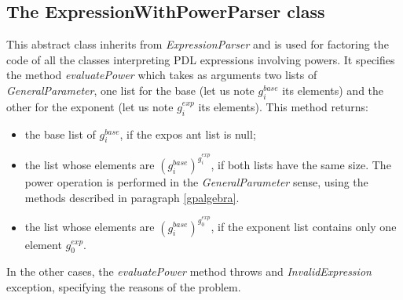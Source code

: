 \documentclass[a4paper,11pt] {ivoa}
\begin{document}
\subsection{The ExpressionWithPowerParser class}
This abstract class inherits from {\it ExpressionParser} and is used for factoring the code of all the classes interpreting PDL expressions involving powers. 
It specifies the method {\it evaluatePower} which takes as arguments two lists of {\it GeneralParameter}, one list for the base (let us note $g_i^{base}$ its elements) 
and the other for the exponent (let us note $g_i^{exp}$ its elements). This method returns:
\begin{itemize}
\item the base list of $g_i^{base}$, if the expos ant list is null;\\
\item the list whose elements are $\displaystyle \left(g_i^{base}\right)^{g_i^{exp}}$, if both lists have the same size. The power operation is performed in the {\it GeneralParameter} sense, using the methods described in paragraph \ref{gpalgebra}.
\item the list whose elements are  $\displaystyle \left(g_i^{base}\right)^{g_0^{exp}}$, if the exponent list contains only one element $g_0^{exp}$.
\end{itemize}
In the other cases, the  {\it evaluatePower} method throws and {\it InvalidExpression} exception, specifying the reasons of the problem.
\end{document}
